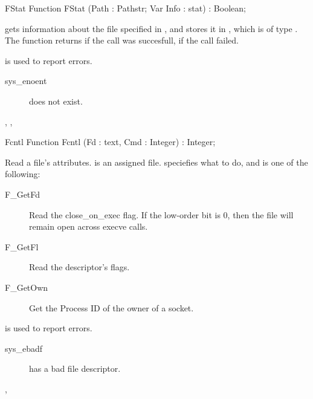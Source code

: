 \begin{function}{FStat}
\Declaration
Function FStat (Path : Pathstr; Var Info : stat) : Boolean;

\Description

 gets information about the file specified in , and stores it in 
, which is of type .
The function returns  if the call was succesfull,  if the call
failed.

\Errors
  is used to report errors.
\begin{description}
\item[sys\_enoent]  does not exist.
\end{description}

\SeeAlso
{}, , 
\end{function}
\begin{function}{Fcntl}
\Declaration
Function Fcntl (Fd :  text, Cmd : Integer) : Integer;

\Description

Read a file's attributes.  is an assigned file.
 speciefies what to do, and is one of the following:
\begin{description}
\item[F\_GetFd] Read the close\_on\_exec flag. If the low-order bit is 0, then
the file will remain open across execve calls.
\item[F\_GetFl] Read the descriptor's flags.
\item[F\_GetOwn] Get the Process ID of the owner of a socket.
\end{description}

\Errors

 is used to report errors.
\begin{description}
\item[sys\_ebadf]  has a bad file descriptor.
\end{description}

\SeeAlso
{},  
\end{function}
